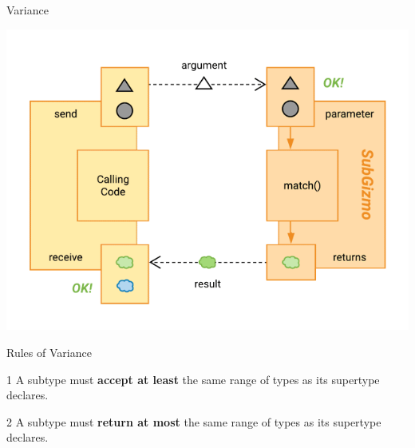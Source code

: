\documentclass[xcolor=pdftex,dvipsnames,table]{beamer}
\newenvironment{wideitemize}{\itemize\addtolength{\itemsep}{5pt}}{\enditemize}
\begin{document}
\begin{frame}{Variance}
  \begin{center}
    \includegraphics[height=0.9\textheight,keepaspectratio]{images/function-call-ok-covariance}
  \end{center}
\end{frame}

\begin{frame}{Rules of Variance}
  \begin{wideitemize}
    \item[1] A subtype must \textbf{accept at least} the same range of types as its supertype declares.
    \item[2] A subtype must \textbf{return at most} the same range of types as its supertype declares.
  \end{wideitemize}
\end{frame}
\end{document}
